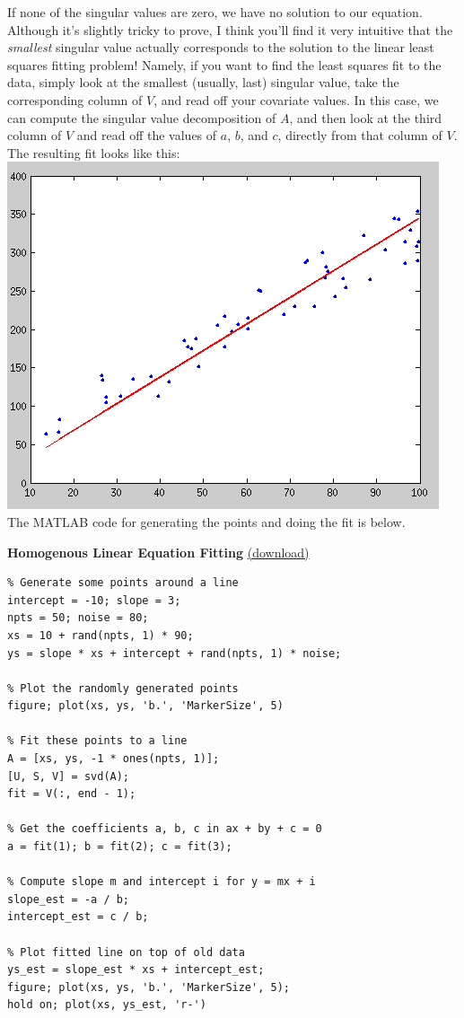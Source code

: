 \documentclass[11pt]{article}
\begin{document}
If none of the singular values are zero, we have no solution to our equation. Although it's slightly
tricky to prove, I think you'll find it very intuitive that the \emph{smallest} singular value
actually corresponds to the solution to the linear least squares fitting problem! Namely, if you
want to find the least squares fit to the data, simply look at the smallest (usually, last) singular
value, take the corresponding column of $V$, and read off your covariate values. In this case, we
can compute the singular value decomposition of $A$, and then look at the third column of $V$ and
read off the values of $a$, $b$, and $c$, directly from that column of $V$. The resulting fit looks
like this:\\
\includegraphics[scale=0.6]{images/random_points_fit.png}\\

The MATLAB code for generating the points and doing the fit is below.

\textbf{Homogenous Linear Equation Fitting} \href{http://andrew.gibiansky.com/downloads/code/points.m}{(download)}
\begin{verbatim}
% Generate some points around a line
intercept = -10; slope = 3;
npts = 50; noise = 80;
xs = 10 + rand(npts, 1) * 90;
ys = slope * xs + intercept + rand(npts, 1) * noise;

% Plot the randomly generated points
figure; plot(xs, ys, 'b.', 'MarkerSize', 5)

% Fit these points to a line
A = [xs, ys, -1 * ones(npts, 1)];
[U, S, V] = svd(A);
fit = V(:, end - 1);

% Get the coefficients a, b, c in ax + by + c = 0
a = fit(1); b = fit(2); c = fit(3);

% Compute slope m and intercept i for y = mx + i
slope_est = -a / b;
intercept_est = c / b;

% Plot fitted line on top of old data
ys_est = slope_est * xs + intercept_est;
figure; plot(xs, ys, 'b.', 'MarkerSize', 5);
hold on; plot(xs, ys_est, 'r-')
\end{verbatim}
\end{document}
